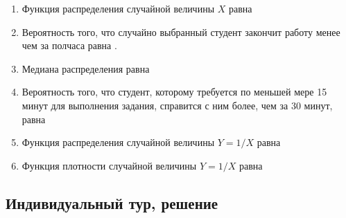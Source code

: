 \documentclass[12pt, a4paper]{article}\usepackage[]{graphicx}\usepackage[]{color}
\begin{document}
\begin{enumerate}
\begin{enumerate}
\item Функция распределения случайной величины $X$ равна \underline{\hspace{2cm}}
\item Вероятность того, что случайно выбранный студент закончит работу менее чем за полчаса равна \underline{\hspace{2cm}}.
\item Медиана распределения равна \underline{\hspace{2cm}}
\item Вероятность того, что студент, которому требуется по меньшей мере 15 минут для выполнения задания, справится с ним более, чем за 30 минут, равна \underline{\hspace{2cm}}
\item Функция распределения случайной величины $Y=1/X$ равна \underline{\hspace{2cm}}
\item Функция плотности случайной величины $Y=1/X$ равна \underline{\hspace{2cm}}
\end{enumerate}

\end{enumerate}

\subsection{Индивидуальный тур, решение}
\end{document}
